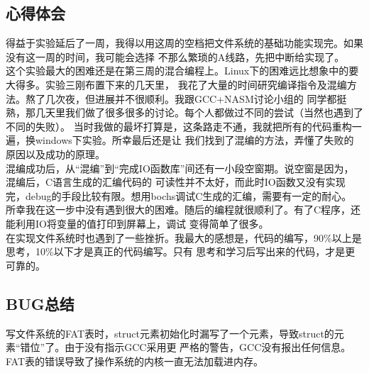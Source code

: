 \documentclass[a4paper]{article}
\begin{document}
    \subsection{心得体会}
    得益于实验延后了一周，我得以用这周的空档把文件系统的基础功能实现完。如果没有这一周的时间，我可能会选择
    不那么繁琐的A线路，先把中断给实现了。 \\
    
    这个实验最大的困难还是在第三周的混合编程上。Linux下的困难远比想象中的要大得多。实验三刚布置下来的几天里，
    我花了大量的时间研究编译指令及混编方法。熬了几次夜，但进展并不很顺利。我跟GCC+NASM讨论小组的
    同学都挺熟，那几天里我们做了很多很多的讨论。每个人都做过不同的尝试（当然也遇到了不同的失败）。
    当时我做的最坏打算是，这条路走不通，我就把所有的代码重构一遍，换windows下实验。所幸最后还是让
    我们找到了混编的方法，弄懂了失败的原因以及成功的原理。\\ 

    混编成功后，从``混编''到``完成IO函数库''间还有一小段空窗期。说空窗是因为，混编后，C语言生成的汇编代码的
    可读性并不太好，而此时IO函数又没有实现完，debug的手段比较有限。想用bochs调试C生成的汇编，需要有一定的耐心。
    所幸我在这一步中没有遇到很大的困难。随后的编程就很顺利了。有了C程序，还能利用IO将变量的值打印到屏幕上，调试
    变得简单了很多。\\
    
    在实现文件系统时也遇到了一些挫折。我最大的感想是，代码的编写，90\%以上是思考，10\%以下才是真正的代码编写。只有
    思考和学习后写出来的代码，才是更可靠的。
    \subsection{BUG总结} \label{sec:bug}
    写文件系统的FAT表时，struct元素初始化时漏写了一个元素，导致struct的元素``错位''了。由于没有指示GCC采用更
    严格的警告，GCC没有报出任何信息。FAT表的错误导致了操作系统的内核一直无法加载进内存。\\
    
\end{document}
